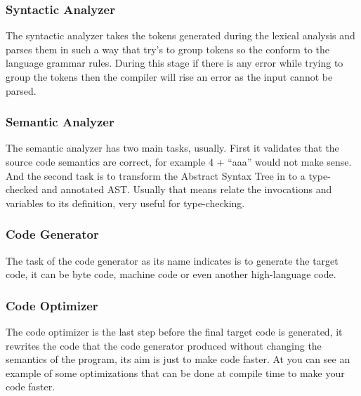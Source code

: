 \subsubsection{Syntactic Analyzer}
The syntactic analyzer takes the tokens generated during the lexical analysis and parses them in such a way that try’s
to group tokens so the conform to the language grammar rules. During this stage if there is any error while trying to
group the tokens then the compiler will rise an error as the input cannot be parsed.

\subsubsection{Semantic Analyzer}
The semantic analyzer has two main tasks, usually. First it validates that the source code semantics are correct, for
example 4 + “aaa” would not make sense. And the second task is to transform the Abstract Syntax Tree in to a type-checked
and annotated AST. Usually that means relate the invocations and variables to its definition, very useful for type-checking.

\subsubsection{Code Generator}
The task of the code generator as its name indicates is to generate the target code, it can be byte code, machine code
or even another high-language code.

\subsubsection{Code Optimizer}
The code optimizer is the last step before the final target code is generated, it rewrites the code that the code generator
produced without changing the semantics of the program, its aim is just to make code faster. At \cite{compiler-optimizations}
you can see an example of some optimizations that can be done at compile time to make your code faster.

